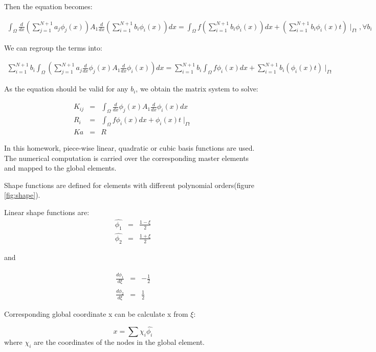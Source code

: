 \documentclass[paper=a4, fontsize=11pt]{article} %
\begin{document}
Then the equation becomes:

\begin{eqnarray}
\int_{\Omega} \frac{d}{dx} (\sum_{j=1}^{N+1} a_j \phi_j(x)) A_1 \frac{d}{dx} (\sum_{i=1}^{N+1} b_i \phi_i(x))dx = \int_{\Omega} f (\sum_{i=1}^{N+1} b_i \phi_i(x)) dx + (\sum_{i=1}^{N+1} b_i \phi_i(x) t) \mid _{\Gamma t}, \forall b_i
\end{eqnarray}


We can regroup the terms into:

\begin{eqnarray}
\sum_{i=1}^{N+1} b_i \int_{\Omega} (\sum_{j=1}^{N+1} a_j \frac{d}{dx} \phi_j(x) A_1 \frac{d}{dx} \phi_i(x)) dx = \sum_{i=1}^{N+1} b_i \int_{\Omega} f \phi_i(x) dx + \sum_{i=1}^{N+1} b_i (\phi_i(x) t) \mid _{\Gamma t}
\end{eqnarray}

As the equation should be valid for any $b_i$, we obtain the matrix system to solve:
 
\begin{eqnarray}
K_{ij} &=& \int_{\Omega} \frac{d}{dx} \phi_j(x) A_1 \frac{d}{dx} \phi_i(x) dx \nonumber\\
R_i &=& \int_{\Omega} f \phi_i(x) dx + \phi_i(x) t \mid _{\Gamma t}\nonumber\\
K a &=& R
\end{eqnarray}


In this homework, piece-wise linear, quadratic or cubic basis functions are used. The numerical computation is carried over the corresponding master elements and mapped to the global elements. 

Shape functions are defined for elements with different polynomial orders(figure \ref{fig:shape}).

Linear shape functions are:
\begin{eqnarray}
\hat{\phi_1} &=& \frac{1-\xi}{2}\nonumber\\
\hat{\phi_2} &=& \frac{1+\xi}{2}
\end{eqnarray}

and

\begin{eqnarray}
\frac{d\hat{\phi_1}}{d\xi} &=& -\frac{1}{2}\nonumber\\
\frac{d\hat{\phi_2}}{d\xi} &=& \frac{1}{2}
\end{eqnarray}

Corresponding global coordinate x can be calculate x from $\xi$:

\begin{equation}
x = \sum{\chi _i \hat{\phi _i}}
\end{equation} 
where $\chi_i$ are the coordinates of the nodes in the global element. 
\end{document}

